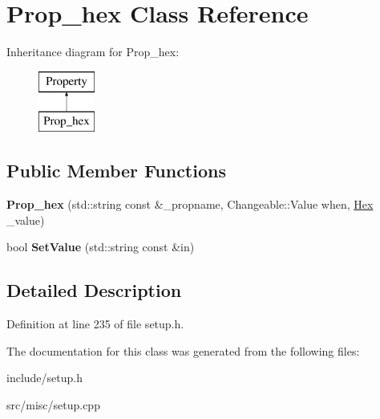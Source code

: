 \hypertarget{classProp__hex}{\section{Prop\-\_\-hex Class Reference}
\label{classProp__hex}
}
Inheritance diagram for Prop\-\_\-hex\-:\begin{figure}[H]
\begin{center}
\leavevmode
\includegraphics[height=2.000000cm]{classProp__hex}
\end{center}
\end{figure}
\subsection*{Public Member Functions}
\begin{DoxyCompactItemize}
\item 
\hypertarget{classProp__hex_a5a9df57c5efae0c495056cda181ccf40}{{\bfseries Prop\-\_\-hex} (std\-::string const \&\-\_\-propname, Changeable\-::\-Value when, \hyperlink{classHex}{Hex} \-\_\-value)}\label{classProp__hex_a5a9df57c5efae0c495056cda181ccf40}

\item 
\hypertarget{classProp__hex_ab1461b9f682fa0aac1e45d544905aaed}{bool {\bfseries Set\-Value} (std\-::string const \&in)}\label{classProp__hex_ab1461b9f682fa0aac1e45d544905aaed}

\end{DoxyCompactItemize}


\subsection{Detailed Description}


Definition at line 235 of file setup.\-h.



The documentation for this class was generated from the following files\-:\begin{DoxyCompactItemize}
\item 
include/setup.\-h\item 
src/misc/setup.\-cpp\end{DoxyCompactItemize}
